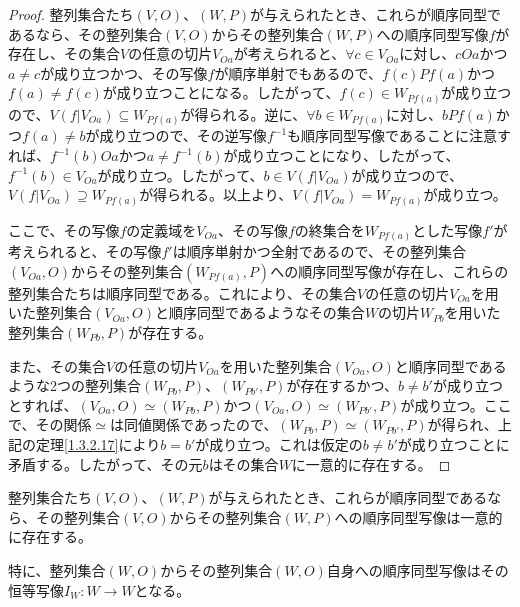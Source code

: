 \documentclass[dvipdfmx]{jsarticle}
\begin{document}
\begin{proof}
整列集合たち$(V,O)$、$(W,P)$が与えられたとき、これらが順序同型であるなら、その整列集合$(V,O)$からその整列集合$(W,P)$への順序同型写像$f$が存在し、その集合$V$の任意の切片$V_{Oa}$が考えられると、$\forall c \in V_{Oa}$に対し、$cOa$かつ$a \neq c$が成り立つかつ、その写像$f$が順序単射でもあるので、$f(c)Pf(a)$かつ$f(a) \neq f(c)$が成り立つことになる。したがって、$f(c) \in W_{Pf(a)}$が成り立つので、$V\left( f|V_{Oa} \right) \subseteq W_{Pf(a)}$が得られる。逆に、$\forall b \in W_{Pf(a)}$に対し、$bPf(a)$かつ$f(a) \neq b$が成り立つので、その逆写像$f^{- 1}$も順序同型写像であることに注意すれば、$f^{- 1}(b)Oa$かつ$a \neq f^{- 1}(b)$が成り立つことになり、したがって、$f^{- 1}(b) \in V_{Oa}$が成り立つ。したがって、$b \in V\left( f|V_{Oa} \right)$が成り立つので、$V\left( f|V_{Oa} \right) \supseteq W_{Pf(a)}$が得られる。以上より、$V\left( f|V_{Oa} \right) = W_{Pf(a)}$が成り立つ。\par
ここで、その写像$f$の定義域を$V_{Oa}$、その写像$f$の終集合を$W_{Pf(a)}$とした写像$f'$が考えられると、その写像$f'$は順序単射かつ全射であるので、その整列集合$\left( V_{Oa},O \right)$からその整列集合$\left( W_{Pf(a)},P \right)$への順序同型写像が存在し、これらの整列集合たちは順序同型である。これにより、その集合$V$の任意の切片$V_{Oa}$を用いた整列集合$\left( V_{Oa},O \right)$と順序同型であるようなその集合$W$の切片$W_{Pb}$を用いた整列集合$\left( W_{Pb},P \right)$が存在する。\par
また、その集合$V$の任意の切片$V_{Oa}$を用いた整列集合$\left( V_{Oa},O \right)$と順序同型であるような2つの整列集合$\left( W_{Pb},P \right)$、$\left( W_{Pb'},P \right)$が存在するかつ、$b \neq b'$が成り立つとすれば、$\left( V_{Oa},O \right) \simeq \left( W_{Pb},P \right)$かつ$\left( V_{Oa},O \right) \simeq \left( W_{Pb'},P \right)$が成り立つ。ここで、その関係$\simeq$は同値関係であったので、$\left( W_{Pb},P \right) \simeq \left( W_{Pb'},P \right)$が得られ、上記の定理\ref{1.3.2.17}により$b = b'$が成り立つ。これは仮定の$b \neq b'$が成り立つことに矛盾する。したがって、その元$b$はその集合$W$に一意的に存在する。
\end{proof}
\begin{thm}\label{1.3.2.19}
整列集合たち$(V,O)$、$(W,P)$が与えられたとき、これらが順序同型であるなら、その整列集合$(V,O)$からその整列集合$(W,P)$への順序同型写像は一意的に存在する。\par
特に、整列集合$(W,O)$からその整列集合$(W,O)$自身への順序同型写像はその恒等写像$I_{W}:W \rightarrow W$となる。
\end{thm}
\end{document}
